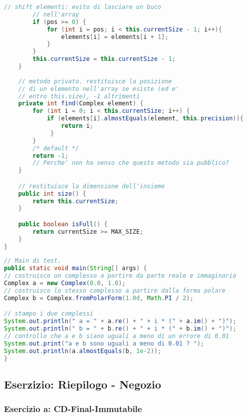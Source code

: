 \documentclass{article}
\begin{document}
\begin{lstlisting}[language=Java,escapechar=|]
	    // shift elementi: evito di lasciare un buco
	    // nell'array
	    if (pos >= 0) {
	        for (int i = pos; i < this.currentSize - 1; i++){
	            elements[i] = elements[i + 1];
	        }
	    }
		this.currentSize = this.currentSize - 1;
    }
    
    // metodo privato. restituisce la posizione
    // di un elemento nell'array se esiste (ed e'
    // entro this.size), -1 altrimenti
    private int find(Complex element) {
        for (int i = 0; i < this.currentSize; i++) {
            if (elements[i].almostEquals(element, this.precision)){
                return i;
             }
	    }
    	/* default */
	    return -1;
	    // Perche' non ha senso che questo metodo sia pubblico?
    }

    // restituisce la dimensione dell'insieme
    public int size() {
	    return this.currentSize;
    }

    public boolean isFull() {
	    return currentSize >= MAX_SIZE;
    }
}
\end{lstlisting}

\begin{lstlisting}[language=Java,escapechar=|]
// Main di test.
public static void main(String[] args) {
// costruisco un complesso a partire da parte reale e immaginaria
Complex a = new Complex(0.0, 1.0);
// costruisco lo stesso complesso a partire dalla forma polare
Complex b = Complex.fromPolarForm(1.0d, Math.PI / 2);

// stampo i due complessi
System.out.println(" a = " + a.re() + " + i * (" + a.im() + ")");
System.out.println(" b = " + b.re() + " + i * (" + b.im() + ")");
// controllo che a e b siano uguali a meno di un errore di 0.01
System.out.print("a e b sono uguali a meno di 0.01 ? ");
System.out.println(a.almostEquals(b, 1e-2));
}

\end{lstlisting}

\subsection{Eserzizio: Riepilogo - Negozio}
\subsubsection{Esercizio a: CD-Final-Immutabile}
\end{document}
